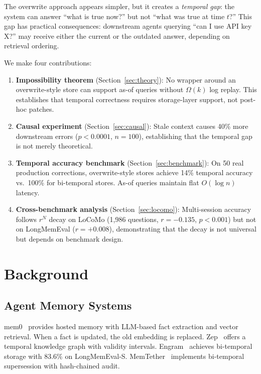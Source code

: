 \documentclass{article}
\begin{document}
The overwrite approach appears simpler, but it creates a \emph{temporal gap}: the system can answer ``what is true now?'' but not ``what was true at time $t$?'' This gap has practical consequences: downstream agents querying ``can I use API key X?'' may receive either the current or the outdated answer, depending on retrieval ordering.

We make four contributions:

\begin{enumerate}
\item \textbf{Impossibility theorem} (Section~\ref{sec:theory}): No wrapper around an overwrite-style store can support as-of queries without $\Omega(k)$ log replay. This establishes that temporal correctness requires storage-layer support, not post-hoc patches.
\item \textbf{Causal experiment} (Section~\ref{sec:causal}): Stale context causes 40\% more downstream errors ($p < 0.0001$, $n{=}100$), establishing that the temporal gap is not merely theoretical.
\item \textbf{Temporal accuracy benchmark} (Section~\ref{sec:benchmark}): On 50 real production corrections, overwrite-style stores achieve 14\% temporal accuracy vs.\ 100\% for bi-temporal stores. As-of queries maintain flat $O(\log n)$ latency.
\item \textbf{Cross-benchmark analysis} (Section~\ref{sec:locomo}): Multi-session accuracy follows $r^N$ decay on LoCoMo (1{,}986 questions, $r = -0.135$, $p < 0.001$) but not on LongMemEval ($r = +0.008$), demonstrating that the decay is not universal but depends on benchmark design.
\end{enumerate}

\section{Background}
\label{sec:related}

\subsection{Agent Memory Systems}
mem0~\citep{mem0} provides hosted memory with LLM-based fact extraction and vector retrieval. When a fact is updated, the old embedding is replaced. Zep~\citep{zep} offers a temporal knowledge graph with validity intervals. Engram~\citep{engram} achieves bi-temporal storage with 83.6\% on LongMemEval-S. MemTether~\citep{memtether} implements bi-temporal supersession with hash-chained audit.
\end{document}

